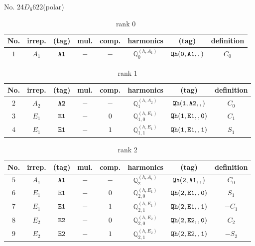 \documentclass[fleqn,8pt]{jsarticle}
\begin{document}
\setcounter{MaxMatrixCols}{16}

\begin{center}
\LARGE
No. 24\quad$D_{6}$\quad$622$\quad[ hexagonal ] (polar)
\end{center}
\begin{table}[ht!]
\begin{center}
\caption{rank 0}
\renewcommand{\arraystretch}{1.3}
\begin{tabular}{cccccccc} \hline \hline
No. & irrep. & (tag) & mul. & comp. & harmonics & (tag) & definition \\ \hline
$ 1 $ & $ A_{1} $ & $ {\tt A1} $ & $ - $ & $ - $ & $ \mathbb{Q}_{0}^{(h,A_{1})} $ & $ {\tt Qh(0,A1,,)} $ & $ C_{0} $ \\
 \hline \hline
\end{tabular}
\end{center}
\end{table}
\begin{table}[ht!]
\begin{center}
\caption{rank 1}
\renewcommand{\arraystretch}{1.3}
\begin{tabular}{cccccccc} \hline \hline
No. & irrep. & (tag) & mul. & comp. & harmonics & (tag) & definition \\ \hline
$ 2 $ & $ A_{2} $ & $ {\tt A2} $ & $ - $ & $ - $ & $ \mathbb{Q}_{1}^{(h,A_{2})} $ & $ {\tt Qh(1,A2,,)} $ & $ C_{0} $ \\
$ 3 $ & $ E_{1} $ & $ {\tt E1} $ & $ - $ & $ 0 $ & $ \mathbb{Q}_{1,0}^{(h,E_{1})} $ & $ {\tt Qh(1,E1,,0)} $ & $ C_{1} $ \\
$ 4 $ & $ E_{1} $ & $ {\tt E1} $ & $ - $ & $ 1 $ & $ \mathbb{Q}_{1,1}^{(h,E_{1})} $ & $ {\tt Qh(1,E1,,1)} $ & $ S_{1} $ \\
 \hline \hline
\end{tabular}
\end{center}
\end{table}
\begin{table}[ht!]
\begin{center}
\caption{rank 2}
\renewcommand{\arraystretch}{1.3}
\begin{tabular}{cccccccc} \hline \hline
No. & irrep. & (tag) & mul. & comp. & harmonics & (tag) & definition \\ \hline
$ 5 $ & $ A_{1} $ & $ {\tt A1} $ & $ - $ & $ - $ & $ \mathbb{Q}_{2}^{(h,A_{1})} $ & $ {\tt Qh(2,A1,,)} $ & $ C_{0} $ \\
$ 6 $ & $ E_{1} $ & $ {\tt E1} $ & $ - $ & $ 0 $ & $ \mathbb{Q}_{2,0}^{(h,E_{1})} $ & $ {\tt Qh(2,E1,,0)} $ & $ S_{1} $ \\
$ 7 $ & $ E_{1} $ & $ {\tt E1} $ & $ - $ & $ 1 $ & $ \mathbb{Q}_{2,1}^{(h,E_{1})} $ & $ {\tt Qh(2,E1,,1)} $ & $ - C_{1} $ \\
$ 8 $ & $ E_{2} $ & $ {\tt E2} $ & $ - $ & $ 0 $ & $ \mathbb{Q}_{2,0}^{(h,E_{2})} $ & $ {\tt Qh(2,E2,,0)} $ & $ C_{2} $ \\
$ 9 $ & $ E_{2} $ & $ {\tt E2} $ & $ - $ & $ 1 $ & $ \mathbb{Q}_{2,1}^{(h,E_{2})} $ & $ {\tt Qh(2,E2,,1)} $ & $ - S_{2} $ \\
 \hline \hline
\end{tabular}
\end{center}
\end{table}
\end{document}
